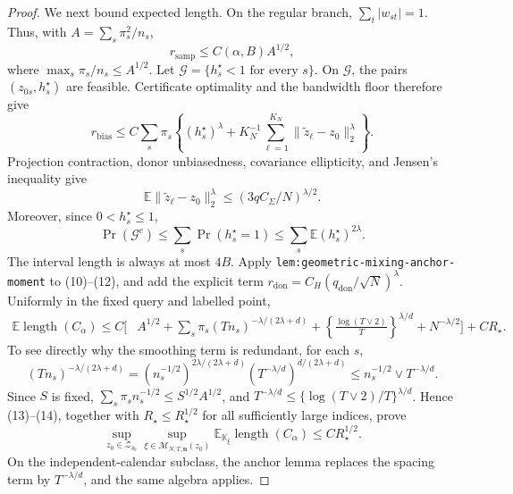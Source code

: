 \documentclass{article}
\begin{document}
\begin{proof}
We next bound expected length.  On the regular branch,
\(\sum_t|w_{st}|=1\).  Thus, with \(A=\sum_s\pi_s^2/n_s\),
\[
 r_{\mathrm{samp}}\le C(\alpha,B)A^{1/2},                  \tag{9}
\]
where \(\max_s\pi_s/n_s\le A^{1/2}\).  Let
\(\mathcal G=\{h_s^\star<1\text{ for every }s\}\).  On \(\mathcal G\), the pairs \((z_{0s},h_s^\star)\) are feasible.  Certificate optimality and the bandwidth floor therefore give
\[
 r_{\mathrm{bias}}
 \le C\sum_s\pi_s\left\{
 (h_s^\star)^\lambda+K_N^{-1}\sum_{\ell=1}^{K_N}
 \|\widetilde z_\ell-z_0\|_2^\lambda\right\}.            \tag{10}
\]
Projection contraction, donor unbiasedness, covariance ellipticity, and Jensen's inequality give
\[
 \mathbb E\|\widetilde z_\ell-z_0\|_2^\lambda
 \le\left(3qC_\Sigma/N\right)^{\lambda/2}.                 \tag{11}
\]
Moreover, since \(0<h_s^\star\le1\),
\[
 \Pr(\mathcal G^c)
 \le\sum_s\Pr(h_s^\star=1)
 \le\sum_s\mathbb E(h_s^\star)^{2\lambda}.               \tag{12}
\]
The interval length is always at most \(4B\).  Apply
\texttt{lem:geometric-mixing-anchor-moment} to (10)--(12), and add the explicit term
\(r_{\mathrm{don}}=C_H(q_{\mathrm{don}}/\sqrt N)^\lambda\).  Uniformly in the fixed query and labelled point,
\[
\begin{aligned}
 \mathbb E\operatorname{length}(C_\alpha)
 \le C\bigg[&A^{1/2}+
 \sum_s\pi_s(Tn_s)^{-\lambda/(2\lambda+d)}+
 \left\{\frac{\log(T\vee2)}{T}\right\}^{\lambda/d}
 +N^{-\lambda/2}\bigg]+CR_\star.
\end{aligned}                                               \tag{13}
\]
To see directly why the smoothing term is redundant, for each \(s\),
\[
 (Tn_s)^{-\lambda/(2\lambda+d)}
 =(n_s^{-1/2})^{2\lambda/(2\lambda+d)}
   (T^{-\lambda/d})^{d/(2\lambda+d)}
 \le n_s^{-1/2}\vee T^{-\lambda/d}.                       \tag{14}
\]
Since \(S\) is fixed,
\(\sum_s\pi_sn_s^{-1/2}\le S^{1/2}A^{1/2}\), and
\(T^{-\lambda/d}\le\{\log(T\vee2)/T\}^{\lambda/d}\).  Hence (13)--(14), together with \(R_\star\le R_\star^{1/2}\) for all sufficiently large indices, prove
\[
 \sup_{z_0\in\mathcal Z_{\delta_0}}
 \sup_{\xi\in\mathcal M_{N,T,\mathbf n}(z_0)}
 \mathbb E_{\mathbb K_\xi}\operatorname{length}(C_\alpha)
 \le CR_\star^{1/2}.                                       \tag{15}
\]
On the independent-calendar subclass, the anchor lemma replaces the spacing term by \(T^{-\lambda/d}\), and the same algebra applies.


\end{proof}
\end{document}
